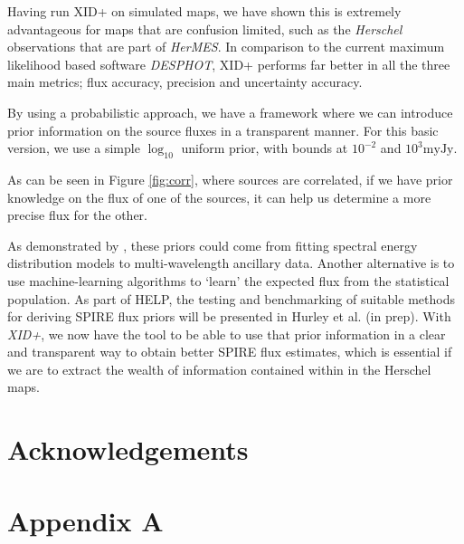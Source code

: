 \documentclass[useAMS,usenatbib]{mnras}
\begin{document}
Having run XID+ on simulated maps, we have shown this is extremely advantageous for maps that are confusion limited, such as the \emph{Herschel} observations that are part of \emph{HerMES}. In comparison to the current maximum likelihood based software \emph{DESPHOT}, XID+ performs far better in all the three main metrics; flux accuracy, precision and uncertainty accuracy. 
 
By using a probabilistic approach, we have a framework where we can introduce prior information on the source fluxes in a transparent manner. For this basic version, we use a simple $\log_{10}$ uniform prior, with bounds at $10^{-2}$ and $10^{3}\mathrm{myJy}$. 

As can be seen in Figure \ref{fig:corr}, where sources are correlated, if we have prior knowledge on the flux of one of the sources, it can help us determine a more precise flux for the other.

As demonstrated by \cite{Safarzadeh:2015}, these priors could come from fitting spectral energy distribution models to multi-wavelength ancillary data. Another alternative is to use machine-learning algorithms to `learn' the expected flux from the statistical population. As part of HELP, the testing and benchmarking of suitable methods for deriving SPIRE flux priors will be presented in Hurley et al. (in prep). With \emph{XID+}, we now have the tool to be able to use that prior information in a clear and transparent way to obtain better SPIRE flux estimates, which is essential if we are to extract the wealth of information contained within in the Herschel maps.

\section*{Acknowledgements}%
%
%
%

\appendix
\section*{Appendix A}\label{Stan_model}
\onecolumn

%
%
%
%
%
%
%
\end{document}
